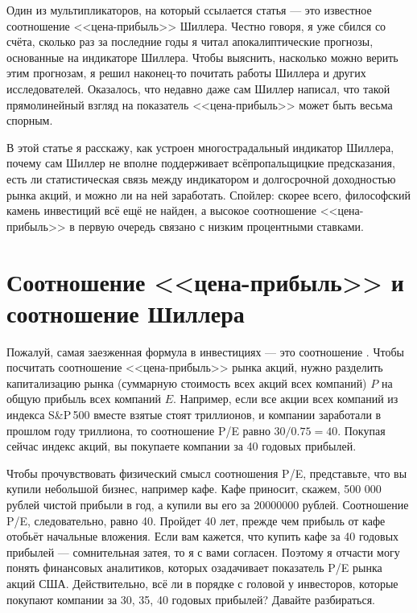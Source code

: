 Один из мультипликаторов, на который ссылается статья --- это известное
соотношение <<цена-прибыль>> Шиллера. Честно говоря, я уже сбился со счёта, 
сколько раз за последние годы я читал апокалиптические прогнозы, основанные на 
индикаторе Шиллера. Чтобы выяснить, насколько можно верить этим прогнозам, я 
решил наконец-то почитать работы Шиллера и других исследователей. Оказалось, 
что недавно даже сам Шиллер написал, что такой прямолинейный взгляд на 
показатель <<цена-прибыль>> может быть весьма спорным. 

В этой статье я расскажу, как устроен многострадальный индикатор Шиллера, 
почему сам Шиллер не вполне поддерживает всёпропальщицкие предсказания, есть ли 
статистическая связь между индикатором и долгосрочной доходностью рынка акций, 
и можно ли на ней заработать. Спойлер: скорее всего, философский камень 
инвестиций всё ещё не найден, а высокое соотношение <<цена-прибыль>> в первую 
очередь связано с низким процентными ставками.

\section*{Соотношение <<цена-прибыль>> и соотношение Шиллера}

Пожалуй, самая заезженная формула в инвестициях --- это соотношение 
. Чтобы посчитать соотношение 
<<цена-прибыль>> рынка акций, нужно разделить капитализацию рынка (суммарную 
стоимость всех акций всех компаний) $P$ на общую прибыль всех компаний $E$. 
Например, если все акции всех компаний из индекса S\&P\,500 вместе взятые стоят 
 триллионов, и компании заработали в прошлом году  
триллиона, то соотношение P/E равно $30/0.75 = 40$. Покупая сейчас индекс 
акций, вы покупаете компании за 40 годовых прибылей.

Чтобы прочувствовать физический смысл соотношения P/E, представьте, что вы 
купили небольшой бизнес, например кафе. Кафе приносит, скажем, \num{500 
000} рублей чистой прибыли в год, а купили вы его за \num{20 000 000} рублей. 
Соотношение P/E, следовательно, равно 40. Пройдет 40 лет, прежде чем прибыль 
от кафе отобьёт начальные вложения. Если вам кажется, что купить кафе за 40 
годовых прибылей --- сомнительная затея, то я с вами согласен. Поэтому я 
отчасти могу понять финансовых аналитиков, которых озадачивает показатель P/E 
рынка акций США. Действительно, всё ли в порядке с головой у инвесторов, 
которые покупают компании за 30, 35, 40 годовых прибылей? Давайте разбираться.

